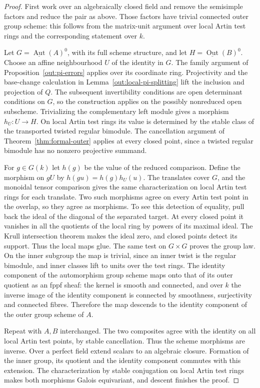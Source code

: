 \documentclass[12pt,a4paper,english,reqno]{amsart}
\numberwithin{equation}{section}
\theoremstyle{plain}
\theoremstyle{definition}
\begin{document}
\begin{proof}
First work over an algebraically closed field and remove the
semisimple factors and reduce the pair as above. Those factors
have trivial connected outer group scheme: this follows from
the matrix-unit argument over local Artin test rings and the
corresponding statement over $k$.

Let $G=\underline{\operatorname{Aut}}(A)^0$, with its full
scheme structure, and let $H=\underline{\operatorname{Out}}(B)^0$.
Choose an affine neighbourhood $U$ of the identity in $G$.
The family argument of Proposition~\ref{out:pi-errors} applies
over its coordinate ring. Projectivity and the base-change
calculation in Lemma~\ref{out:local-pi-splitting} lift the
inclusion and projection of $Q$. The subsequent invertibility
conditions are open determinant conditions on $G$, so the
construction applies on the possibly nonreduced open
subscheme. Trivializing the complementary left module gives a
morphism $h_U:U\to H$. On local Artin test rings its value is
determined by the stable class of the transported twisted
regular bimodule. The cancellation argument of
Theorem~\ref{thm:formal-outer} applies at every closed point,
since a twisted regular bimodule has no nonzero projective
summand.

For $g\in G(k)$ let $h(g)$ be the value of the reduced
comparison. Define the morphism on $gU$ by
$h(gu)=h(g)h_U(u)$. The translates cover $G$, and the monoidal
tensor comparison gives the same characterization on local
Artin test rings for each translate. Two such morphisms agree on every Artin
test point in the overlap, so they agree as morphisms. To
see this detection of equality, pull back the ideal of the
diagonal of the separated target. At every closed point it
vanishes in all the quotients of the local ring by powers of
its maximal ideal. The Krull intersection theorem makes the
ideal zero, and closed points detect its support. Thus the
local maps glue. The same test on $G\times G$ proves the group
law. On the inner subgroup the map is trivial, since an inner
twist is the regular bimodule, and inner classes lift to units
over the test rings. The identity component of the automorphism
group scheme maps onto that of its outer quotient as an fppf
sheaf: the kernel is smooth and connected, and over $k$
the inverse image of the identity component is connected
by smoothness, surjectivity and connected fibres. Therefore
the map descends to the identity component of the outer
group scheme of $A$.

Repeat with $A,B$ interchanged. The two composites agree with
the identity on all local Artin test points, by stable
cancellation. Thus the scheme morphisms are inverse.
Over a perfect field extend scalars to an algebraic closure.
Formation of the inner group, its quotient and the identity
component commutes with this extension. The characterization
by stable conjugation on local Artin test rings makes both
morphisms Galois equivariant, and descent finishes the proof.
\end{proof}
\end{document}
